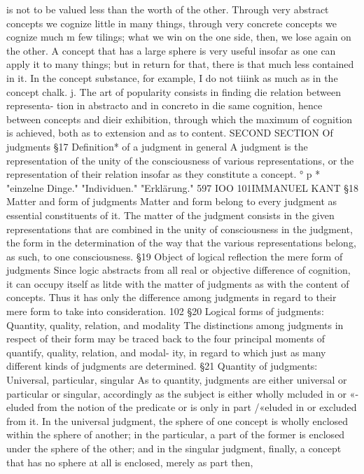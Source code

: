 is not to be valued less than the worth of the other. Through very abstract
concepts we cognize little in many things, through very concrete concepts
we cognize much m few tilings; what we win on the one side, then, we lose
again on the other. A concept that has a large sphere is very useful insofar
as one can apply it to many things; but in return for that, there is that
much less contained in it. In the concept substance, for example, I do not
tiiink as much as in the concept chalk.
j. The art of popularity consists in finding die relation between representa-
tion in abstracto and in concreto in die same cognition, hence between
concepts and dieir exhibition, through which the maximum of cognition
is achieved, both as to extension and as to content.
SECOND SECTION
Of judgments
§17
Definition* of a judgment in general
A judgment is the representation of the unity of the consciousness of
various representations, or the representation of their relation insofar as
they constitute a concept.
°
p
*
"einzelne Dinge."
"Individuen."
"Erklärung."
597
IOO
101IMMANUEL KANT
§18
Matter and form of judgments
Matter and form belong to every judgment as essential constituents of it.
The matter of the judgment consists in the given representations that are
combined in the unity of consciousness in the judgment, the form in the
determination of the way that the various representations belong, as such,
to one consciousness.
§19
Object of logical reflection the mere form of judgments
Since logic abstracts from all real or objective difference of cognition, it
can occupy itself as litde with the matter of judgments as with the content
of concepts. Thus it has only the difference among judgments in regard to
their mere form to take into consideration.
102
§20
Logical forms of judgments: Quantity, quality, relation, and modality
The distinctions among judgments in respect of their form may be traced
back to the four principal moments of quantify, quality, relation, and modal-
ity, in regard to which just as many different kinds of judgments are
determined.
§21
Quantity of judgments: Universal, particular, singular
As to quantity, judgments are either universal or particular or singular,
accordingly as the subject is either wholly mcluded in or «-eluded from the
notion of the predicate or is only in part /«eluded in or excluded from it. In
the universal judgment, the sphere of one concept is wholly enclosed
within the sphere of another; in the particular, a part of the former is
enclosed under the sphere of the other; and in the singular judgment,
finally, a concept that has no sphere at all is enclosed, merely as part then,
